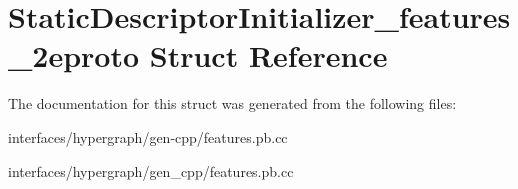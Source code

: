 \hypertarget{structStaticDescriptorInitializer__features__2eproto}{
\section{StaticDescriptorInitializer\_\-features\_\-2eproto Struct Reference}
\label{structStaticDescriptorInitializer__features__2eproto}
}


The documentation for this struct was generated from the following files:\begin{DoxyCompactItemize}
\item 
interfaces/hypergraph/gen-\/cpp/features.pb.cc\item 
interfaces/hypergraph/gen\_\-cpp/features.pb.cc\end{DoxyCompactItemize}
